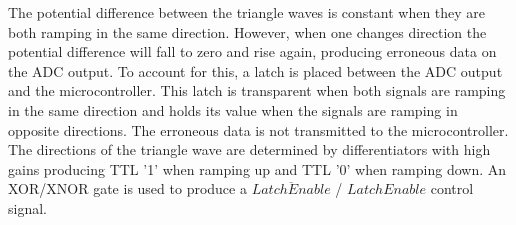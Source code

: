 The potential difference between the triangle waves is constant when they are both ramping in the same direction. 
However, when one changes direction the potential difference will fall to zero and rise again, producing erroneous data on the ADC output. 
To account for this, a latch is placed between the ADC output and the microcontroller. 
This latch is transparent when both signals are ramping in the same direction and holds its value when the signals are ramping in opposite directions. 
The erroneous data is not transmitted to the microcontroller. 
The directions of the triangle wave are determined by differentiators with high gains producing TTL '1' when ramping up and TTL '0' when ramping down. 
An XOR/XNOR gate is used to produce a $\overline{LatchEnable}$ / $LatchEnable$ control signal.
 
